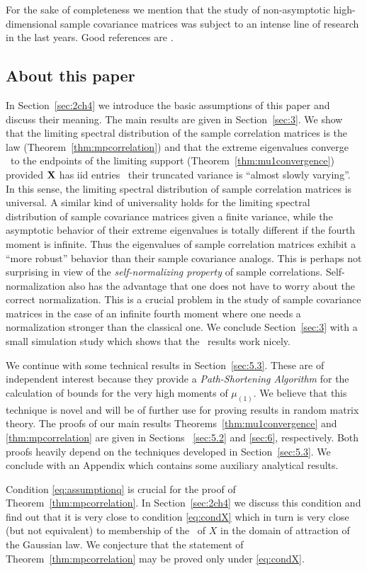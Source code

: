 For the sake of completeness we mention that the study of non-asymptotic high-dimensional sample covariance matrices was subject to an intense line of research in the last years. Good references are \cite{srivastava:vershynin:2013,adamczak:litvak:pajor:jaegermann:2010,adamczak:litvak:pajor:jaegermann:2011,yao:zheng:bai:2015}.

\subsection{About this paper}
In Section~\ref{sec:2ch4} we introduce the basic assumptions of this paper and discuss their meaning.
The main results are given in Section~\ref{sec:3}.
We show that the limiting spectral distribution of the 
sample correlation matrices is the \MP law (Theorem~\ref{thm:mpcorrelation}) 
and that the extreme eigenvalues converge  \as~to the endpoints of the limiting support (Theorem~\ref{thm:mu1convergence}) provided ${\mathbf X}$ has iid entries \sth\
their truncated variance is ``almost slowly varying''. 
In this sense, the limiting spectral distribution of sample correlation matrices is universal. 
A similar kind of universality holds for the limiting spectral distribution of sample covariance matrices given a finite variance, while the asymptotic behavior of their extreme eigenvalues is totally different if the fourth moment is infinite.
Thus the eigenvalues of sample correlation matrices exhibit a  ``more robust'' behavior than their sample covariance analogs. 
This is perhaps not surprising in view of the {\em self-normalizing property} of sample correlations.
Self-normalization also has the advantage that one does not have to worry about the correct normalization.
This is a crucial problem in the study of sample covariance matrices in the case of an infinite fourth moment 
where one needs a normalization stronger than the classical one.
We conclude Section~\ref{sec:3} with a small simulation study which shows that the \asy\ results work nicely.
\par
We continue with some technical results in Section~\ref{sec:5.3}. These are of independent interest
because they provide a {\em Path-Shortening Algorithm} for the calculation of bounds for the very high moments of 
$\mu_{(1)}$. We believe that this technique is novel and will be of further use for proving results
in random matrix theory. The proofs of our main results Theorems~\ref{thm:mu1convergence} and \ref{thm:mpcorrelation}
are given in Sections~ \ref{sec:5.2} and \ref{sec:6}, respectively. Both proofs heavily depend on the techniques 
developed in   Section~\ref{sec:5.3}. We conclude with an Appendix which contains some auxiliary analytical results.
\par
Condition \eqref{eq:assumptionq} is crucial for the proof of Theorem~\ref{thm:mpcorrelation}. In Section~\ref{sec:2ch4}
we discuss this condition and find out that it is very close to condition \eqref{eq:condX}
which in turn is very close (but not equivalent) to membership of the \ds\ of $X$ in the domain of attraction
of the Gaussian law. We conjecture that the statement of Theorem~\ref{thm:mpcorrelation} may be proved only under \eqref{eq:condX}.

